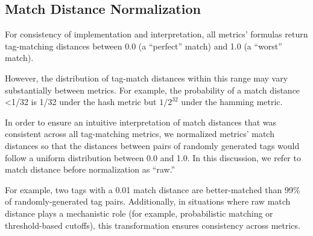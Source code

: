 \subsection{Match Distance Normalization}

For consistency of implementation and interpretation, all metrics' formulas return tag-matching distances between 0.0 (a ``perfect'' match) and 1.0 (a ``worst'' match).

However, the distribution of tag-match distances within this range may vary substantially between metrics.
For example, the probability of a match distance <1/32 is 1/32 under the hash metric but $1/2^32$ under the hamming metric.

In order to ensure an intuitive interpretation of match distances that was consistent across all tag-matching metrics, we normalized metrics' match distances so that the distances between pairs of randomly generated tags would follow a uniform distribution between 0.0 and 1.0.
In this discussion, we refer to match distance before normalization as ``raw.''

For example, two tags with a 0.01 match distance are better-matched than 99\% of randomly-generated tag pairs.
Additionally, in situations where raw match distance plays a mechanistic role (for example, probabilistic matching or threshold-based cutoffs), this transformation ensures consistency across metrics.

